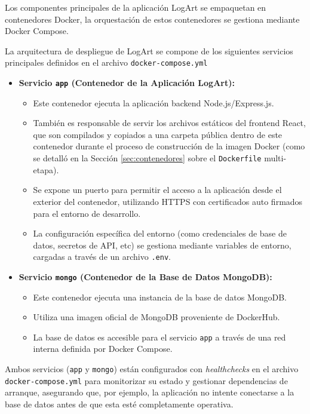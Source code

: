 Los componentes principales de la aplicación LogArt se empaquetan en contenedores Docker, la orquestación de estos contenedores se gestiona mediante Docker Compose.

La arquitectura de despliegue de LogArt se compone de los siguientes servicios principales definidos en el archivo \texttt{docker-compose.yml}

\begin{itemize}
    \item \textbf{Servicio \texttt{app} (Contenedor de la Aplicación LogArt):}
    \begin{itemize}
        \item Este contenedor ejecuta la aplicación backend Node.js/Express.js.
        \item También es responsable de servir los archivos estáticos del frontend React, que son compilados y copiados a una carpeta pública dentro de este contenedor durante el proceso de construcción de la imagen Docker (como se detalló en la Sección \ref{sec:contenedores} sobre el \texttt{Dockerfile} multi-etapa).
        \item Se expone un puerto para permitir el acceso a la aplicación desde el exterior del contenedor, utilizando HTTPS con certificados auto firmados para el entorno de desarrollo.
        \item La configuración específica del entorno (como credenciales de base de datos, secretos de API, etc) se gestiona mediante variables de entorno, cargadas a través de un archivo \texttt{.env}.
    \end{itemize}
    \item \textbf{Servicio \texttt{mongo} (Contenedor de la Base de Datos MongoDB):}
    \begin{itemize}
        \item Este contenedor ejecuta una instancia de la base de datos MongoDB.
        \item Utiliza una imagen oficial de MongoDB proveniente de DockerHub.
        \item La base de datos es accesible para el servicio \texttt{app} a través de una red interna definida por Docker Compose.
    \end{itemize}
\end{itemize}

Ambos servicios (\texttt{app} y \texttt{mongo}) están configurados con \textit{healthchecks} en el archivo \texttt{docker-compose.yml} para monitorizar su estado y gestionar dependencias de arranque, asegurando que, por ejemplo, la aplicación no intente conectarse a la base de datos antes de que esta esté completamente operativa.

